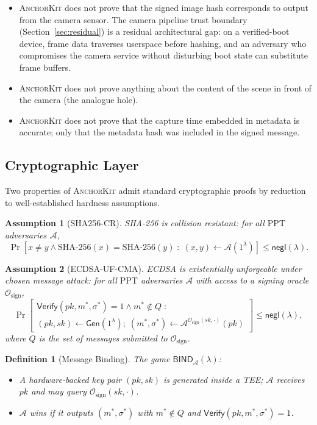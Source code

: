 \documentclass[11pt,a4paper]{article}
\newtheorem{definition}{Definition}
\newtheorem{assumption}{Assumption}
\newcommand{\negl}{\mathsf{negl}}
\newcommand{\Gen}{\mathsf{Gen}}
\newcommand{\Verify}{\mathsf{Verify}}
\newcommand{\ppt}{\mathrm{PPT}}
\newcommand{\BIND}{\mathsf{BIND}}
\newcommand{\calA}{\mathcal{A}}
\newcommand{\calO}{\mathcal{O}}
\newcommand{\SHA}{\text{SHA-256}}
\newcommand{\AK}{\textsc{AnchorKit}\xspace}
\begin{document}
\begin{itemize}
  \item \AK does not prove that the signed image hash corresponds to output
    from the camera sensor.  The camera pipeline trust boundary
    (Section~\ref{sec:residual}) is a residual architectural gap: on a
    verified-boot device, frame data traverses userspace before hashing, and an
    adversary who compromises the camera service without disturbing boot state
    can substitute frame buffers.
  \item \AK does not prove anything about the content of the scene in front of
    the camera (the analogue hole).
  \item \AK does not prove that the capture time embedded in metadata is
    accurate; only that the metadata hash was included in the signed message.
\end{itemize}

\subsection{Cryptographic Layer}
\label{sec:crypto}

Two properties of \AK admit standard cryptographic proofs by reduction to
well-established hardness assumptions.

\begin{assumption}[\textup{SHA256-CR}]
\label{asm:sha256}
SHA-256 is collision resistant: for all $\ppt$ adversaries $\calA$,
\[
  \Pr\!\left[x \neq y \wedge \SHA(x) = \SHA(y) \;:\; (x, y) \leftarrow
    \calA(1^\lambda)\right] \leq \negl(\lambda).
\]
\end{assumption}

\begin{assumption}[\textup{ECDSA-UF-CMA}]
\label{asm:ecdsa}
ECDSA is existentially unforgeable under chosen message attack: for all $\ppt$
adversaries $\calA$ with access to a signing oracle $\calO_{\mathrm{sign}}$,
\[
  \Pr\!\left[\begin{array}{l}
    \Verify(pk, m^*, \sigma^*) = 1 \wedge m^* \notin Q \;:\;\\[2pt]
    (pk, sk) \leftarrow \Gen(1^\lambda);\;
    (m^*, \sigma^*) \leftarrow \calA^{\calO_{\mathrm{sign}}(sk,\cdot)}(pk)
  \end{array}\right]
  \leq \negl(\lambda),
\]
where $Q$ is the set of messages submitted to $\calO_{\mathrm{sign}}$.
\end{assumption}

\begin{definition}[Message Binding]
\label{def:binding}
The game $\BIND_\calA(\lambda)$:
\begin{itemize}
  \item A hardware-backed key pair $(pk, sk)$ is generated inside a TEE;
    $\calA$ receives $pk$ and may query $\calO_{\mathrm{sign}}(sk, \cdot)$.
  \item $\calA$ wins if it outputs $(m^*, \sigma^*)$ with $m^* \notin Q$ and
    $\Verify(pk, m^*, \sigma^*) = 1$.
\end{itemize}
\end{definition}
\end{document}

